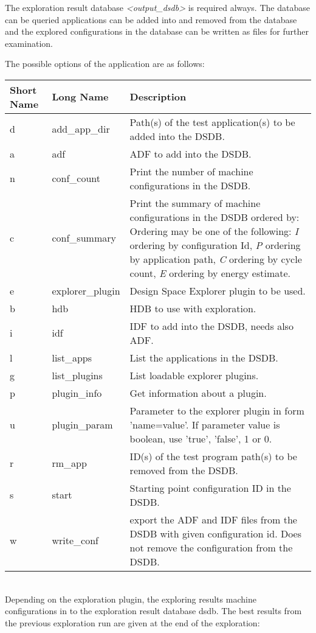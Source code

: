 \documentclass[twoside]{tceusermanual}
\begin{document}
The exploration result database \emph{<output\_dsdb>} is required always. The
database can be queried applications can be added into and removed from the 
database and the explored configurations in the database can be written as
files for further examination.

The possible options of the application are as follows:\\

\begin{tabular}{p{}p{}p{}}
\textbf{Short Name} &\textbf{Long Name} &\textbf{Description} \\
\hline
d & add\_app\_dir & Path(s) of the test application(s) to be added into the DSDB.\\
a & adf & ADF to add into the DSDB.\\
n & conf\_count & Print the number of machine configurations in the DSDB.\\
c & conf\_summary & Print the summary of machine configurations in the DSDB
ordered by: Ordering may be one of the following: \emph{I} ordering by 
configuration Id, \emph{P} ordering by application path, \emph{C} ordering by
cycle count, \emph{E} ordering by energy estimate.\\
e & explorer\_plugin & Design Space Explorer plugin to be used.\\
b & hdb & HDB to use with exploration.\\
i & idf & IDF to add into the DSDB, needs also ADF.\\
l & list\_apps & List the applications in the DSDB.\\
g & list\_plugins & List loadable explorer plugins.\\
p & plugin\_info & Get information about a plugin.\\
u & plugin\_param & Parameter to the explorer plugin in form 'name=value'.
If parameter value is boolean, use 'true', 'false', 1 or 0.\\
r & rm\_app & ID(s) of the test program path(s) to be removed from the DSDB.\\
s & start & Starting point configuration ID in the DSDB.\\
w & write\_conf & export the ADF and IDF files from the DSDB with given
configuration id. Does not remove the configuration from the DSDB.\\
\end{tabular}\\

Depending on the exploration plugin, the exploring results machine
configurations in to the exploration result database dsdb. The best results
from the previous exploration run are given at the end of the exploration:
\end{document}
